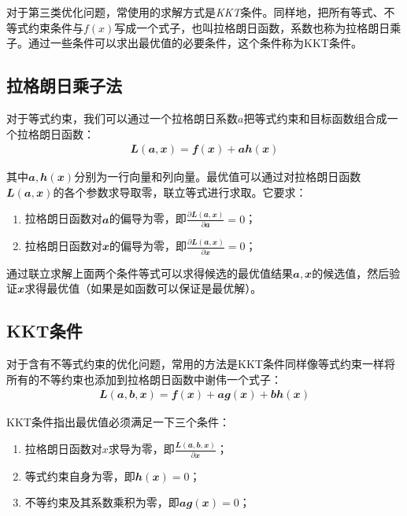 对于第三类优化问题，常使用的求解方式是\emph{KKT}条件。同样地，把所有等式、不等式约束条件与$f(x)$写成一个式子，也叫拉格朗日函数，系数也称为拉格朗日乘子。通过一些条件可以求出最优值的必要条件，这个条件称为KKT条件。

\subsection{拉格朗日乘子法}
对于等式约束，我们可以通过一个拉格朗日系数$a$把等式约束和目标函数组合成一个拉格朗日函数：
\begin{align}
  \mathbfit{L}(\mathbfit{a},\mathbfit{x})=\mathbfit{f}(\mathbfit{x})+\mathbfit{a}\mathbfit{h}(\mathbfit{x})
\end{align}

其中$\mathbfit{a},\mathbfit{h}(\mathbfit{x})$分别为一行向量和列向量。最优值可以通过对拉格朗日函数$\mathbfit{L}(\mathbfit{a},\mathbfit{x})$的各个参数求导取零，联立等式进行求取。它要求：
\begin{enumerate}
  \item 拉格朗日函数对$\mathbfit{a}$的偏导为零，即$\frac{\partial\mathbfit{L}(\mathbfit{a},\mathbfit{x})}{\partial \mathbfit{a}}=0$；
  \item 拉格朗日函数对$\mathbfit{x}$的偏导为零，即$\frac{\partial\mathbfit{L}(\mathbfit{a},\mathbfit{x})}{\partial \mathbfit{x}}=0$；
\end{enumerate}

通过联立求解上面两个条件等式可以求得候选的最优值结果$\mathbfit{a},\mathbfit{x}$的候选值，然后验证$\mathbfit{x}$求得最优值（如果是如函数可以保证是最优解）。

\subsection{KKT条件}
对于含有不等式约束的优化问题，常用的方法是KKT条件同样像等式约束一样将所有的不等约束也添加到拉格朗日函数中谢伟一个式子：
\begin{align}
  \mathbfit{L}(\mathbfit{a},\mathbfit{b},\mathbfit{x})=\mathbfit{f}(\mathbfit{x})+\mathbfit{a}\mathbfit{g}(\mathbfit{x})+\mathbfit{b}\mathbfit{h}(\mathbfit{x})
\end{align}

KKT条件指出最优值必须满足一下三个条件：
\begin{enumerate}
  \item 拉格朗日函数对$x$求导为零，即$\frac{\mathbfit{L}(\mathbfit{a},\mathbfit{b},\mathbfit{x})}{\partial \mathbfit{x}}$；
  \item 等式约束自身为零，即$\mathbfit{h}(\mathbfit{x})=0$；
  \item 不等约束及其系数乘积为零，即$\mathbfit{a}\mathbfit{g}(\mathbfit{x})=0$；
\end{enumerate}

